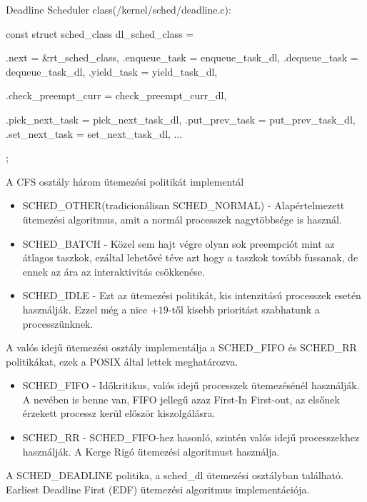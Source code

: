Deadline Scheduler class(/kernel/sched/deadline.c):
\begin{cpp}
const struct sched_class dl_sched_class = {
	.next			= &rt_sched_class,
	.enqueue_task		= enqueue_task_dl,
	.dequeue_task		= dequeue_task_dl,
	.yield_task		= yield_task_dl,

	.check_preempt_curr	= check_preempt_curr_dl,

	.pick_next_task		= pick_next_task_dl,
	.put_prev_task		= put_prev_task_dl,
	.set_next_task		= set_next_task_dl,
...
};
\end{cpp}



A CFS osztály három ütemezési politikát implementál
\begin{itemize}
	\item SCHED\_OTHER(tradicionálisan  SCHED\_NORMAL) - Alapértelmezett ütemezési algoritmus, amit a normál processzek nagytöbbsége is használ.

    \item SCHED\_BATCH - Közel sem hajt végre olyan sok preempciót mint az átlagos taszkok, ezáltal lehetővé téve azt hogy a taszkok tovább fussanak, de ennek az ára az interaktivitás csökkenése.
        
	\item SCHED\_IDLE - Ezt az ütemezési politikát, kis intenzitású processzek esetén használják. Ezzel még a nice $+19$-től kisebb prioritást szabhatunk a processzünknek.
\end{itemize}
A valós idejű ütemezési osztály implementálja a SCHED\_FIFO és SCHED\_RR politikákat, ezek a POSIX által lettek meghatározva.
\begin{itemize}
	\item SCHED\_FIFO - Időkritikus, valós idejű processzek ütemezésénél használják. A nevében is benne van, FIFO jellegű azaz First-In First-out, az elsőnek érzekett processz kerül először kiszolgálásra. 

	\item SCHED\_RR - SCHED\_FIFO-hez hasonló, szintén valós idejű processzekhez használják. A Kerge Rigó ütemezési algoritmust használja.
\end{itemize}

A SCHED\_DEADLINE politika, a sched\_dl ütemezési osztályban található.  Earliest Deadline First (EDF) ütemezési algoritmus implementációja.

